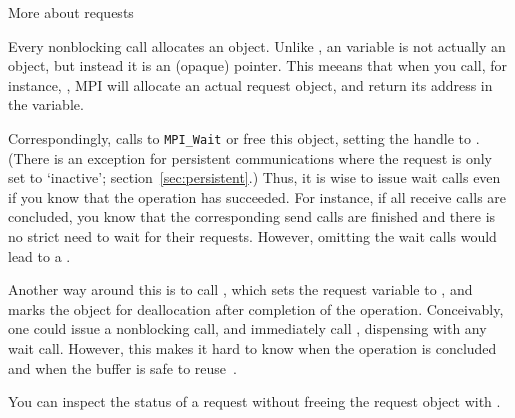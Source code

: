  {More about requests}
\label{ref:mpirequest}

Every nonblocking call allocates an 
object.
Unlike ,
an  variable is not actually an object,
but instead it is an (opaque) pointer.
This meeans that when you call, for instance, ,
MPI will allocate an actual request object, and return its
address in the  variable.

Correspondingly, calls to \lstinline{MPI_Wait} or 
free this object,
setting the handle to .
(There is an exception for persistent communications where
the request is only set to `inactive'; section~\ref{sec:persistent}.)
Thus, it is wise to issue wait calls even
if you know that the operation has succeeded. For instance, if all
receive calls are concluded, you know that the corresponding send
calls are finished and there is no strict need to wait for their
requests. However, omitting the wait calls would lead to a
.

Another way around this is to call ,
which sets the request variable to ,
and marks the object for deallocation after completion of the
operation. Conceivably, one could issue a nonblocking call,
and immediately call , dispensing
with any wait call. However, this makes it hard to know when the operation
is concluded and when the buffer is safe to reuse~\cite{Squyres:evilrequest}.

You can inspect the status of a request without freeing the request object
with .



